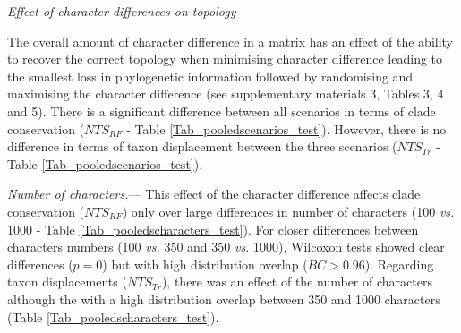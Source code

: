 \documentclass[12pt,letterpaper]{article}
\renewcommand{\subsection}[1]{%
\bigskip
\begin{center}
\begin{large}
\normalfont\itshape #1
\end{large}
\end{center}}
\renewcommand{\subsubsection}[1]{%
\vspace{2ex}
\noindent
\textit{#1.}---}
\begin{document}
\subsection{Effect of character differences on topology}
The overall amount of character difference in a matrix has an effect of the ability to recover the correct topology when minimising character difference leading to the smallest loss in phylogenetic information followed by randomising and maximising the character difference (see supplementary materials 3, Tables 3, 4 and 5).
There is a significant difference between all scenarios in terms of clade conservation ($NTS_{RF}$ - Table \ref{Tab_pooledscenarios_test}).
However, there is no difference in terms of taxon displacement between the three scenarios ($NTS_{Tr}$ - Table \ref{Tab_pooledscenarios_test}).



\subsubsection{Number of characters}
This effect of the character difference affects clade conservation ($NTS_{RF}$) only over large differences in number of characters (100 \textit{vs.} 1000 - Table \ref{Tab_pooledscharacters_test}).
For closer differences between characters numbers (100 \textit{vs.} 350 and 350 \textit{vs.} 1000), Wilcoxon tests showed clear differences ($p = 0$) but with high distribution overlap ($BC > 0.96$).
Regarding taxon displacements ($NTS_{Tr}$), there was an effect of the number of characters  although the with a high distribution overlap between 350 and 1000 characters (Table \ref{Tab_pooledscharacters_test}).
\end{document}
